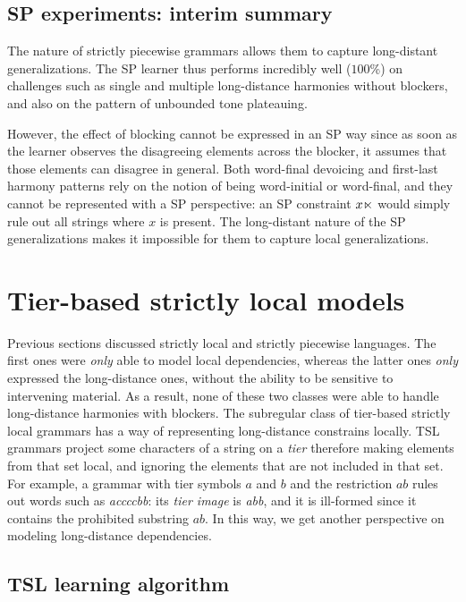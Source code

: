 \subsection{SP experiments: interim summary}


The nature of strictly piecewise grammars allows them to capture long-distant generalizations.
The SP learner thus performs incredibly well ($100$\%) on challenges such 
as single and multiple long-distance harmonies without blockers, and also on the pattern of unbounded tone plateauing.

However, the effect of blocking cannot be expressed in an SP way since as soon as the learner observes the disagreeing elements across the blocker, it assumes that those elements can disagree in general.
Both word-final devoicing and first-last harmony patterns rely on the notion of being word-initial or word-final, and they cannot be represented with a SP perspective: an SP constraint $x\ltimes$ would simply rule out all strings where $x$ is present.
The long-distant nature of the SP generalizations makes it impossible for them to capture local generalizations. 




\section{Tier-based strictly local models}

Previous sections discussed strictly local and strictly piecewise languages.
The first ones were \emph{only} able to model local dependencies, whereas the latter ones \emph{only} expressed the long-distance ones, without the ability to be sensitive to intervening material.
As a result, none of these two classes were able to handle long-distance harmonies with blockers.
The subregular class of tier-based strictly local grammars has a way of representing long-distance constrains locally.
TSL grammars project some characters of a string on a \emph{tier} therefore making elements from that set local, and ignoring the elements that are not included in that set.
For example, a grammar with tier symbols $a$ and $b$ and the restriction $ab$ rules out words such as \emph{accccbb}: its \emph{tier image} is \emph{abb}, and it is ill-formed since it contains the prohibited substring $ab$.
In this way, we get another perspective on modeling long-distance dependencies.


\subsection{TSL learning algorithm}


